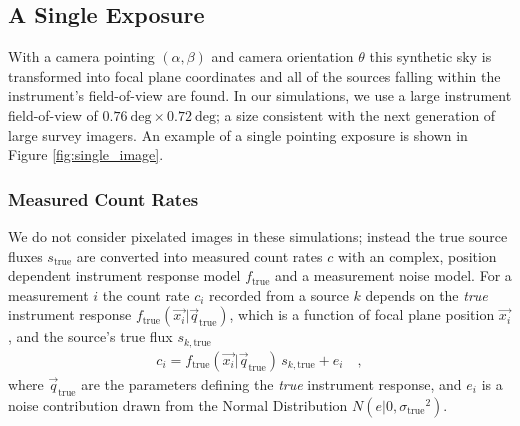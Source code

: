 \documentclass[manuscript]{aastex}
\newcommand{\true}{\text{true}}
\begin{document}
\subsection{A Single Exposure}
\label{sec:single_exposure}
With a camera pointing $(\alpha, \beta)$ and camera orientation $\theta$ this synthetic sky is transformed into focal plane coordinates and all of the sources falling within the instrument's field-of-view are found. In our simulations, we use a large instrument field-of-view of $0.76~ \text{deg} \times 0.72~\text{deg}$; a size consistent with the next generation of large survey imagers. An example of a single pointing exposure is shown in Figure \ref{fig:single_image}.

\subsubsection{Measured Count Rates}
We do not consider pixelated images in these simulations; instead the true source fluxes $s_\true$ are converted into measured count rates $c$ with an complex, position dependent instrument response model $f_\true$ and a measurement noise model. For a measurement $i$ the count rate $c_i$ recorded from a source $k$ depends on the \textit{true} instrument response $f_{\true}(\vec{x_i} | \vec{q}_\true)$, which is a function of focal plane position $\vec{x_i}$, and the source's true flux $s_{k,\true}$ 
\begin{eqnarray*}
c_i = f_{\true}(\vec{x_i} | \vec{q}_\true) \, s_{k, \true} + e_{i} \quad ,
\end{eqnarray*}
where $\vec{q}_\true$ are the parameters defining the \textit{true} instrument response, and $e_i$ is a noise contribution drawn from the Normal Distribution $N(e|0,{\sigma_\true}^2)$. 
\end{document}
